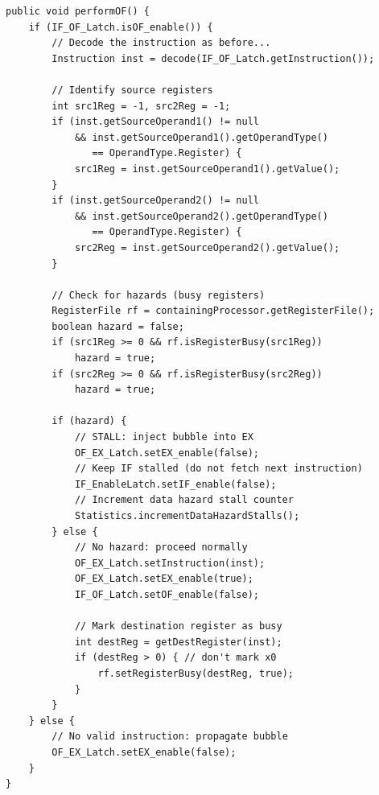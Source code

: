 \documentclass[12pt,a4paper]{article}
\begin{document}
\begin{lstlisting}[style=javastyle, caption={Hazard detection and stalling in OF stage}]
public void performOF() {
    if (IF_OF_Latch.isOF_enable()) {
        // Decode the instruction as before...
        Instruction inst = decode(IF_OF_Latch.getInstruction());

        // Identify source registers
        int src1Reg = -1, src2Reg = -1;
        if (inst.getSourceOperand1() != null
            && inst.getSourceOperand1().getOperandType()
               == OperandType.Register) {
            src1Reg = inst.getSourceOperand1().getValue();
        }
        if (inst.getSourceOperand2() != null
            && inst.getSourceOperand2().getOperandType()
               == OperandType.Register) {
            src2Reg = inst.getSourceOperand2().getValue();
        }

        // Check for hazards (busy registers)
        RegisterFile rf = containingProcessor.getRegisterFile();
        boolean hazard = false;
        if (src1Reg >= 0 && rf.isRegisterBusy(src1Reg))
            hazard = true;
        if (src2Reg >= 0 && rf.isRegisterBusy(src2Reg))
            hazard = true;

        if (hazard) {
            // STALL: inject bubble into EX
            OF_EX_Latch.setEX_enable(false);
            // Keep IF stalled (do not fetch next instruction)
            IF_EnableLatch.setIF_enable(false);
            // Increment data hazard stall counter
            Statistics.incrementDataHazardStalls();
        } else {
            // No hazard: proceed normally
            OF_EX_Latch.setInstruction(inst);
            OF_EX_Latch.setEX_enable(true);
            IF_OF_Latch.setOF_enable(false);

            // Mark destination register as busy
            int destReg = getDestRegister(inst);
            if (destReg > 0) { // don't mark x0
                rf.setRegisterBusy(destReg, true);
            }
        }
    } else {
        // No valid instruction: propagate bubble
        OF_EX_Latch.setEX_enable(false);
    }
}
\end{lstlisting}
\end{document}
